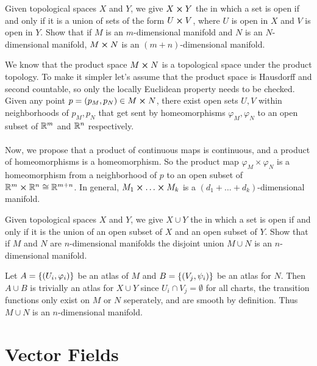 \documentclass[10pt]{article}
\begin{document}
\begin{example}\label{b1e5}
	Given topological spaces $X$ and $Y$, we give $X \cross Y$ the  in which a set is open if and only if it is a union of sets of the form $U \cross V$, where $U$ is open in $X$ and $V$ is open in $Y$. Show that if $M$ is an $m$-dimensional manifold and $N$ is an $N$-dimensional manifold, $M \cross N$ is an $(m+n)$-dimensional manifold.
\end{example}
\sol We know that the product space $M \cross N$ is a topological space under the product topology. To make it simpler let's assume that the product space is Hausdorff and second countable, so only the locally Euclidean property needs to be checked. Given any point $p = (p_M, p_N) \in M \cross N$, there exist open sets $U, V$ within neighborhoods of $p_M, p_N$ that get sent by homeomorphisms $\varphi_M, \varphi_N$ to an open subset of $\mathbb{R}^m$ and $\mathbb{R}^n$ respectively.\\\\
Now, we propose that a product of continuous maps is continuous, and a product of homeomorphisms is a homeomorphism. So the product map $\varphi_M \times \varphi_N$ is a homeomorphism from a neighborhood of $p$ to an open subset of $\mathbb{R}^m \cross \mathbb{R}^n \cong \mathbb{R}^{m+n}$. In general, $M_1 \cross \dots \cross M_k$ is a $(d_1 + \dots + d_k)$-dimensional manifold.


\begin{example}
	Given topological spaces $X$ and $Y$, we give $X \cup Y$ the  in which a set is open if and only if it is the union of an open subset of $X$ and an open subset of $Y$. Show that if $M$ and $N$ are $n$-dimensional manifolds the disjoint union $M \cup N$ is an $n$-dimensional manifold.
\end{example}
\sol Let $A = \lbrace(U_i, \varphi_i)\rbrace$ be an atlas of $M$ and $B = \lbrace(V_j, \psi_i)\rbrace$ be an atlas for $N$. Then $A \cup B$ is trivially an atlas for $X \cup Y$ since $U_i \cap V_j = \emptyset$ for all charts, the transition functions only exist on $M$ or $N$ seperately, and are smooth by definition. Thus $M \cup N$ is an $n$-dimensional manifold.




\newpage
\section{Vector Fields}\label{b1c3}
\end{document}
